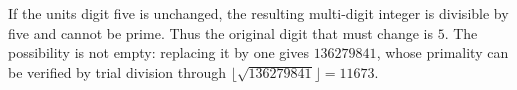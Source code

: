 If the units digit five is unchanged, the resulting multi-digit integer is divisible by five and cannot be prime. Thus the original digit that must change is $\boxed5$. The possibility is not empty: replacing it by one gives $136279841$, whose primality can be verified by trial division through $\lfloor\sqrt{136279841}\rfloor=11673$.
